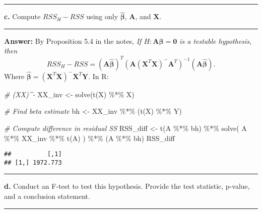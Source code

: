 \documentclass[
]{article}
\newenvironment{Shaded}{\begin{snugshade}}{\end{snugshade}}
\newcommand{\CommentTok}[1]{\textcolor[rgb]{0.56,0.35,0.01}{\textit{#1}}}
\newcommand{\FunctionTok}[1]{\textcolor[rgb]{0.00,0.00,0.00}{#1}}
\newcommand{\NormalTok}[1]{#1}
\newcommand{\OtherTok}[1]{\textcolor[rgb]{0.56,0.35,0.01}{#1}}
\newcommand{\SpecialCharTok}[1]{\textcolor[rgb]{0.00,0.00,0.00}{#1}}
\newcommand{\bmA}{\ensuremath{\bm A}}
\newcommand{\bmX}{\ensuremath{\bm X}}
\newcommand{\bmY}{\ensuremath{\bm Y}}
\newcommand{\bmbeta}{\ensuremath{\bm{\beta}}}
\newcommand{\bbh}{\ensuremath{\hat{\bmbeta}}}
\begin{document}
\begin{center}\rule{0.5\linewidth}{0.5pt}\end{center}

\textbf{c.} Compute \(RSS_H - RSS\) using only \(\bbh\), \(\bmA\), and
\(\bmX\).

\begin{center}\rule{0.5\linewidth}{0.5pt}\end{center}

\textbf{Answer:} By Proposition 5.4 in the notes, \emph{If
\(H:\bmA\bmbeta = \bm0\) is a testable hypothesis, then}
\[RSS_H - RSS = (\bmA\bbh)^T\left( \bmA(\bmX^T\bmX)^-\bmA^T\right)^{-1}(\bmA\bbh).\]
Where \(\bbh = (\bmX^T\bmX)^-\bmX^T\bmY\). In R:

\begin{Shaded}
\begin{Highlighting}[]
\CommentTok{\# (X\textquotesingle{}X)\^{}{-}}
\NormalTok{XX\_inv }\OtherTok{\textless{}{-}} \FunctionTok{solve}\NormalTok{(}\FunctionTok{t}\NormalTok{(X) }\SpecialCharTok{\%*\%}\NormalTok{ X)}

\CommentTok{\# Find beta estimate}
\NormalTok{bh }\OtherTok{\textless{}{-}}\NormalTok{ XX\_inv }\SpecialCharTok{\%*\%}\NormalTok{ (}\FunctionTok{t}\NormalTok{(X) }\SpecialCharTok{\%*\%}\NormalTok{ Y)}

\CommentTok{\# Compute difference in residual SS}
\NormalTok{RSS\_diff }\OtherTok{\textless{}{-}} \FunctionTok{t}\NormalTok{(A }\SpecialCharTok{\%*\%}\NormalTok{ bh) }\SpecialCharTok{\%*\%} \FunctionTok{solve}\NormalTok{( A }\SpecialCharTok{\%*\%}\NormalTok{ XX\_inv }\SpecialCharTok{\%*\%} \FunctionTok{t}\NormalTok{(A) ) }\SpecialCharTok{\%*\%}\NormalTok{ (A }\SpecialCharTok{\%*\%}\NormalTok{ bh)}
\NormalTok{RSS\_diff}
\end{Highlighting}
\end{Shaded}

\begin{verbatim}
##          [,1]
## [1,] 1972.773
\end{verbatim}

\begin{center}\rule{0.5\linewidth}{0.5pt}\end{center}

\textbf{d.} Conduct an F-test to test this hypothesis. Provide the test
statistic, p-value, and a conclusion statement.

\begin{center}\rule{0.5\linewidth}{0.5pt}\end{center}
\end{document}
